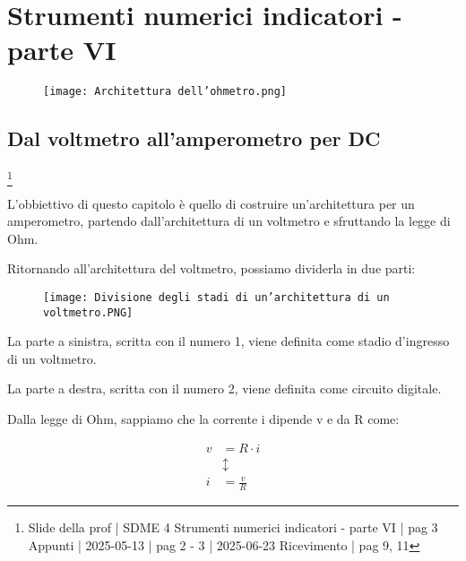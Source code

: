 \chapter{Strumenti numerici indicatori - parte VI}

\begin{figure}[h]
    \centering
    \texttt{[image: Architettura dell'ohmetro.png]}
\end{figure}

\newpage    

\section{Dal voltmetro all'amperometro per DC}
\footnote{Slide della prof | SDME 4 Strumenti numerici indicatori - parte VI | pag 3 \\  
Appunti | 2025-05-13 | pag 2 - 3 | 2025-06-23 Ricevimento | pag 9, 11}

L'obbiettivo di questo capitolo è quello di costruire un'architettura per un amperometro, 
partendo dall'architettura di un voltmetro e sfruttando la legge di Ohm. \newline 

Ritornando all'architettura del voltmetro, possiamo dividerla in due parti:

\begin{figure}[h]
    \centering
    \texttt{[image: Divisione degli stadi di un'architettura di un voltmetro.PNG]}
\end{figure}

La parte a sinistra, scritta con il numero 1, viene definita come stadio d'ingresso di un voltmetro. \newline 

La parte a destra, scritta con il numero 2, viene definita come circuito digitale. \newline 

Dalla legge di Ohm, sappiamo che la corrente i dipende v e da R come:

{
    \Large 
    \begin{equation}
        \begin{split}
            v &= R \cdot i
            \\
            &\updownarrow
            \\
            i &= \frac{v}{R} 
        \end{split}
    \end{equation}
}

\newpage 

